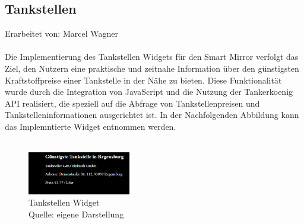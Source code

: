 \subsection{Tankstellen}
Erarbeitet von: Marcel Wagner \\ \\
\noindent
Die Implementierung des Tankstellen Widgets für den Smart Mirror verfolgt das Ziel, den Nutzern eine praktische und zeitnahe Information über den günstigsten Kraftstoffpreise einer Tankstelle in der Nähe zu bieten. Diese Funktionalität wurde durch die Integration von JavaScript und die Nutzung der Tankerkoenig API realisiert, die speziell auf die Abfrage von Tankstellenpreisen und Tankstelleninformationen ausgerichtet ist. In der Nachfolgenden Abbildung kann das Implemntierte Widget entnommen werden. \\ \\
\noindent
\begin{figure}[h]
    \centering
    \includegraphics[width=0.4\textwidth]{pictures/gasstation_widget.png}
  \captionsetup{justification=centering, labelformat=simple, singlelinecheck=false}
    \caption[Tankstellen Widget]{Tankstellen Widget\\ Quelle: eigene Darstellung}
\end{figure}

